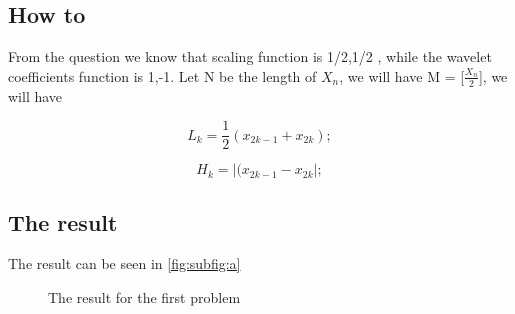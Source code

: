 \documentclass[a4paper,12pt]{article}%
\begin{document}
\subsection{How to}

From the question we know that scaling function is {1/2,1/2} ,
while the wavelet coefficients function is {1,-1}. Let N be the
length of $X_n$, we will have M = [$\frac{X_n}{2}$], we will have

\begin{equation}
L_k=\frac{1}{2}(x_{2k-1} + x_{2k});
\end{equation}

\begin{equation}
H_k=|(x_{2k-1} - x_{2k}|;
\end{equation}

\subsection{The result}
    The result can be seen in \eqref{fig:subfig:a}

\begin{figure}[h]
  \centering
  \hspace{0.5in}
    \hspace{0.5in}
  \caption{The result for the first problem}
  \label{fig:subfig} %
\end{figure}
\end{document}
